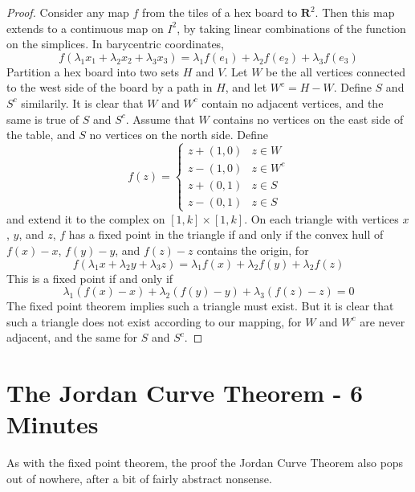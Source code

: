 \documentclass{article}
\theoremstyle{plain}
\begin{document}
\begin{proof}
    Consider any map $f$ from the tiles of a hex board to $\mathbf{R}^2$. Then this map extends to a continuous map on $I^2$, by taking linear combinations of the function on the simplices. In barycentric coordinates,
    \[ f(\lambda_1 x_1 + \lambda_2 x_2 + \lambda_3 x_3) = \lambda_1 f(e_1) + \lambda_2 f(e_2) + \lambda_3 f(e_3) \]
    Partition a hex board into two sets $H$ and $V$. Let $W$ be the all vertices connected to the west side of the board by a path in $H$, and let $W^c = H - W$. Define $S$ and $S^c$ similarily. It is clear that $W$ and $W^c$ contain no adjacent vertices, and the same is true of $S$ and $S^c$. Assume that $W$ contains no vertices on the east side of the table, and $S$ no vertices on the north side. Define
    \[ f(z) = \begin{cases} z + (1,0) & z \in W \\ z - (1,0) & z \in W^c \\ z + (0,1) & z \in S \\ z - (0,1) & z \in S \end{cases} \]
    and extend it to the complex on $[1,k] \times [1,k]$. On each triangle with vertices $x$, $y$, and $z$, $f$ has a fixed point in the triangle if and only if the convex hull of $f(x) - x$, $f(y) - y$, and $f(z) - z$ contains the origin, for
    \[ f(\lambda_1 x + \lambda_2 y + \lambda_3 z) = \lambda_1 f(x) + \lambda_2 f(y) + \lambda_2 f(z) \]
    This is a fixed point if and only if
    \[ \lambda_1 (f(x) - x) + \lambda_2 (f(y) - y) + \lambda_3 (f(z) - z) = 0 \]
    The fixed point theorem implies such a triangle must exist. But it is clear that such a triangle does not exist according to our mapping, for $W$ and $W^c$ are never adjacent, and the same for $S$ and $S^c$.
\end{proof}

\section{The Jordan Curve Theorem - 6 Minutes}

As with the fixed point theorem, the proof the Jordan Curve Theorem also pops out of nowhere, after a bit of fairly abstract nonsense.
\end{document}
